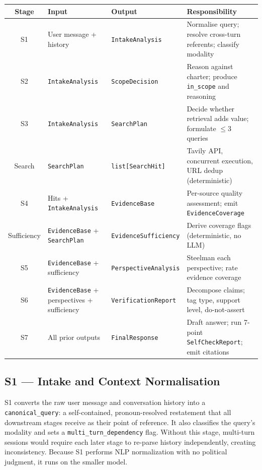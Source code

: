 \documentclass[11pt,letterpaper]{article}
\newcommand{\code}[1]{\texttt{\small #1}}
\begin{document}
\begin{center}
\renewcommand{\arraystretch}{1.2}
\begin{tabular}{c p{2.5cm} p{2.8cm} p{5.3cm}}
\toprule
\textbf{Stage} & \textbf{Input} & \textbf{Output} & \textbf{Responsibility} \\
\midrule
S1 & User message + history & \code{IntakeAnalysis} &
  Normalise query; resolve cross-turn referents; classify modality \\
S2 & \code{IntakeAnalysis} & \code{ScopeDecision} &
  Reason against charter; produce \code{in\_scope} and reasoning \\
S3 & \code{IntakeAnalysis} & \code{SearchPlan} &
  Decide whether retrieval adds value; formulate $\leq$3 queries \\
Search & \code{SearchPlan} & \code{list[SearchHit]} &
  Tavily API, concurrent execution, URL dedup (deterministic) \\
S4 & Hits + \code{IntakeAnalysis} & \code{EvidenceBase} &
  Per-source quality assessment; emit \code{EvidenceCoverage} \\
Sufficiency & \code{EvidenceBase} + \code{SearchPlan} & \code{EvidenceSufficiency} &
  Derive coverage flags (deterministic, no LLM) \\
S5 & \code{EvidenceBase} + sufficiency & \code{PerspectiveAnalysis} &
  Steelman each perspective; rate evidence coverage \\
S6 & \code{EvidenceBase} + perspectives + sufficiency & \code{VerificationReport} &
  Decompose claims; tag type, support level, do-not-assert \\
S7 & All prior outputs & \code{FinalResponse} &
  Draft answer; run 7-point \code{SelfCheckReport}; emit citations \\
\bottomrule
\end{tabular}
\end{center}

\bigskip

\subsection{S1 --- Intake and Context Normalisation}

S1 converts the raw user message and conversation history into a
\code{canonical\_query}: a self-contained, pronoun-resolved restatement that
all downstream stages receive as their point of reference. It also classifies
the query's modality and sets a \code{multi\_turn\_dependency} flag. Without
this stage, multi-turn sessions would require each later stage to re-parse
history independently, creating inconsistency. Because S1 performs NLP
normalization with no political judgment, it runs on the smaller model.
\end{document}

